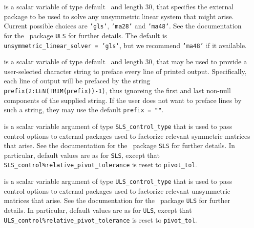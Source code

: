 \documentclass{galahad}
\begin{document}
\begin{description}
 is a scalar variable of type default 
\character\ and length 30, that specifies the external package to be used to
solve any unsymmetric linear system that might arise. Current possible
choices are {\tt 'gls'}, {\tt 'ma28'} and {\tt 'ma48'}.
See the documentation for the \galahad\ package {\tt ULS} for further details.
The default is {\tt unsymmetric\_linear\_solver = 'gls'},
but we recommend {\tt 'ma48'} if it available.

 is a scalar variable of type default \character\
and length 30, that may be used to provide a user-selected
character string to preface every line of printed output.
Specifically, each line of output will be prefaced by the string
{\tt prefix(2:LEN(TRIM(prefix))-1)},
thus ignoreing the first and last non-null components of the
supplied string. If the user does not want to preface lines by such
a string, they may use the default {\tt prefix = ""}.

 is a scalar variable argument of type
{\tt SLS\_control\_type} that is used to pass control
options to external packages used to
factorize relevant symmetric matrices that arise.
See the documentation for the \galahad\ package {\tt SLS} for further details.
In particular, default values are as for {\tt SLS}, except that
{\tt SLS\_control\%rela\-tive\_pivot\_tolerance} is reset to
{\tt pivot\_tol}.

 is a scalar variable argument of type
{\tt ULS\_control\_type} that is used to pass control
options to external packages used to
factorize relevant unsymmetric matrices that arise.
See the documentation for the \galahad\ package {\tt ULS} for further details.
In particular, default values are as for {\tt ULS}, except that
{\tt ULS\_control\%rela\-tive\_pivot\_tolerance} is reset to
{\tt pivot\_tol}.

\end{description}

\end{document}
